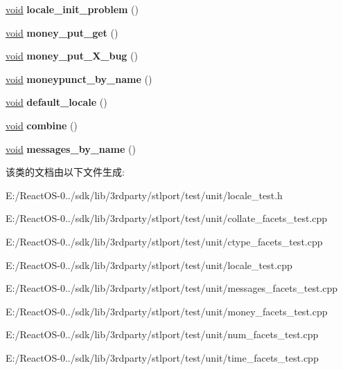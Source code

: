 \begin{DoxyCompactItemize}
\mbox{\label{class_locale_test_a61506d6abb7cf27aa98893d790b34937}} 
\hyperlink{interfacevoid}{void} {\bfseries locale\+\_\+init\+\_\+problem} ()
\item 
\mbox{\label{class_locale_test_a81c269e2385a39986668252106827a59}} 
\hyperlink{interfacevoid}{void} {\bfseries money\+\_\+put\+\_\+get} ()
\item 
\mbox{\label{class_locale_test_a93da01ca0ec6b07f24be195b658589c7}} 
\hyperlink{interfacevoid}{void} {\bfseries money\+\_\+put\+\_\+\+X\+\_\+bug} ()
\item 
\mbox{\label{class_locale_test_a594477720634301ab1faffb76303d43e}} 
\hyperlink{interfacevoid}{void} {\bfseries moneypunct\+\_\+by\+\_\+name} ()
\item 
\mbox{\label{class_locale_test_a30cdd2e98b7c28c78b5569c6aa2c0cd3}} 
\hyperlink{interfacevoid}{void} {\bfseries default\+\_\+locale} ()
\item 
\mbox{\label{class_locale_test_a74bced851b80c94e84ec1c598e36bdb6}} 
\hyperlink{interfacevoid}{void} {\bfseries combine} ()
\item 
\mbox{\label{class_locale_test_a6321a2289883259a2c17fab892d18901}} 
\hyperlink{interfacevoid}{void} {\bfseries messages\+\_\+by\+\_\+name} ()
\end{DoxyCompactItemize}


该类的文档由以下文件生成\+:\begin{DoxyCompactItemize}
\item 
E\+:/\+React\+O\+S-\/0../sdk/lib/3rdparty/stlport/test/unit/locale\+\_\+test.\+h\item 
E\+:/\+React\+O\+S-\/0../sdk/lib/3rdparty/stlport/test/unit/collate\+\_\+facets\+\_\+test.\+cpp\item 
E\+:/\+React\+O\+S-\/0../sdk/lib/3rdparty/stlport/test/unit/ctype\+\_\+facets\+\_\+test.\+cpp\item 
E\+:/\+React\+O\+S-\/0../sdk/lib/3rdparty/stlport/test/unit/locale\+\_\+test.\+cpp\item 
E\+:/\+React\+O\+S-\/0../sdk/lib/3rdparty/stlport/test/unit/messages\+\_\+facets\+\_\+test.\+cpp\item 
E\+:/\+React\+O\+S-\/0../sdk/lib/3rdparty/stlport/test/unit/money\+\_\+facets\+\_\+test.\+cpp\item 
E\+:/\+React\+O\+S-\/0../sdk/lib/3rdparty/stlport/test/unit/num\+\_\+facets\+\_\+test.\+cpp\item 
E\+:/\+React\+O\+S-\/0../sdk/lib/3rdparty/stlport/test/unit/time\+\_\+facets\+\_\+test.\+cpp\end{DoxyCompactItemize}
